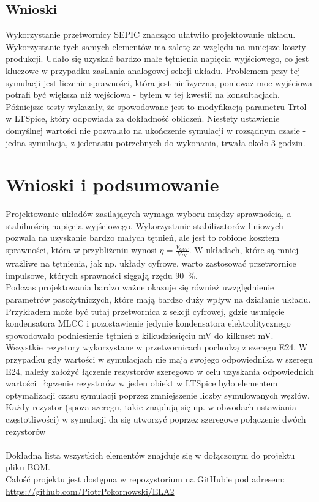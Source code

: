 \documentclass[11pt]{article}
\begin{document}
\subsection{Wnioski}
Wykorzystanie przetwornicy SEPIC znacząco ułatwiło projektowanie układu. Wykorzystanie tych samych elementów ma zaletę ze względu na mniejsze koszty produkcji. Udało się uzyskać bardzo małe tętnienia napięcia wyjściowego, co jest kluczowe w przypadku zasilania analogowej sekcji układu. Problemem przy tej symulacji jest liczenie sprawności, która jest niefizyczna, ponieważ moc wyjściowa potrafi być większa niż wejściowa - byłem w tej kwestii na konsultacjach. Późniejsze testy wykazały, że spowodowane jest to modyfikacją parametru Trtol w LTSpice, który odpowiada za dokładność obliczeń. Niestety ustawienie domyślnej wartości nie pozwalało na ukończenie symulacji w rozsądnym czasie - jedna symulacja, z jedenastu potrzebnych do wykonania, trwała około 3 godzin.

\section{Wnioski i podsumowanie}
Projektowanie układów zasilających wymaga wyboru między sprawnością, a stabilnością napięcia wyjściowego. Wykorzystanie stabilizatorów liniowych pozwala na uzyskanie bardzo małych tętnień, ale jest to robione kosztem sprawności, która w przybliżeniu wynosi $\eta = \frac{V_{OUT}}{V_{IN}}$. W układach, które są mniej wrażliwe na tętnienia, jak np. układy cyfrowe, warto zastosować przetwornice impulsowe, których sprawności sięgają rzędu \SI{90}{\percent}.\\
Podczas projektowania bardzo ważne okazuje się również uwzględnienie parametrów pasożytniczych, które mają bardzo duży wpływ na działanie układu. Przykładem może być tutaj przetwornica z sekcji cyfrowej, gdzie usunięcie kondensatora MLCC i pozostawienie jedynie kondensatora elektrolitycznego spowodowało podniesienie tętnień z kilkudziesięciu mV do kilkuset mV.\\
Wszystkie rezystory wykorzystane w przetwornicach pochodzą z szeregu E24. W przypadku gdy wartości w symulacjach nie mają swojego odpowiednika w szeregu E24, należy założyć łączenie rezystorów szeregowo w celu uzyskania odpowiednich wartości \textemdash \ łączenie rezystorów w jeden obiekt w LTSpice było elementem optymalizacji czasu symulacji poprzez zmniejszenie liczby symulowanych węzłów. Każdy rezystor (spoza szeregu, takie znajdują się np. w obwodach ustawiania częstotliwości) w symulacji da się utworzyć poprzez szeregowe połączenie dwóch rezystorów\\
\\Dokładna lista wszystkich elementów znajduje się w dołączonym do projektu pliku BOM.
\\

\noindent Całość projektu jest dostępna w repozystorium na GitHubie pod adresem:\\ \url{https://github.com/PiotrPokornowski/ELA2}
\end{document}
